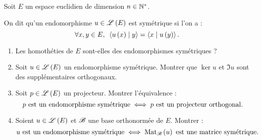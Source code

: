 \begin{corr}
\end{corr}

\begin{exo}
Soit \(E\) un espace euclidien de dimension \(n\in\mathbb{N}^*\).

On dit qu'un endomorphisme \(u\in\mathscr{L}\left(E\right)\) est symétrique si l'on a : \[\quantifs{\forall x,y\in E}\ps{u\paren{x}}{y}=\ps{x}{u\paren{y}}.\]

\begin{enumerate}
\item Les homothéties de \(E\) sont-elles des endomorphismes symétriques ? \\

\item Soit \(u\in\mathscr{L}\left(E\right)\) un endomorphisme symétrique. Montrer que \(\ker u\) et \(\Im u\) sont des supplémentaires orthogonaux. \\

\item Soit \(p\in\mathscr{L}\left(E\right)\) un projecteur. Montrer l'équivalence : \[p\text{ est un endomorphisme symétrique}\iff p\text{ est un projecteur orthogonal}.\]

\item Soient \(u\in\mathscr{L}\left(E\right)\) et \(\mathscr{B}\) une base orthonormée de \(E\). Montrer : \[u\text{ est un endomorphisme symétrique}\ssi\Mat{u}\text{ est une matrice symétrique}.\]
\end{enumerate}
\end{exo}

\begin{corr}
\end{corr}

